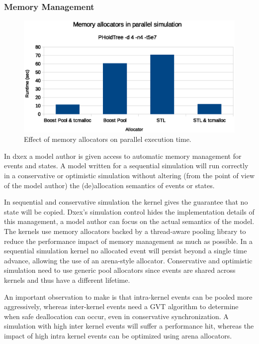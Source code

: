 \subsubsection{Memory Management}
\label{sec:4-subsec:overhead-pgraph:memory}
\begin{figure}
    \center
    \includegraphics[width=\modelfraction\columnwidth]{fig/memory_allocators_parallel.eps}
    \caption{Effect of memory allocators on parallel execution time.}
    \label{fig:memallocators_parallel}
\end{figure}


In dxex a model author is given access to automatic memory management for events and states.
A model written for a sequential simulation will run correctly in a conservative or optimistic simulation without altering (from the point of view of the model author) the (de)allocation semantics of events or states.

In sequential and conservative simulation the kernel gives the guarantee that no state will be copied.
Dxex's simulation control hides the implementation details of this management, a model author can focus on the actual semantics of the model.
The kernels use memory allocators backed by a thread-aware pooling library to reduce the performance impact of memory management as much as possible.
In a sequential simulation kernel no allocated event will persist beyond a single time advance, allowing the use of an arena-style allocator.
Conservative and optimistic simulation need to use generic pool allocators since events are shared across kernels and thus have a different lifetime.

An important observation to make is that intra-kernel events can be pooled more aggressively, whereas inter-kernel events need a GVT algorithm to determine when safe deallocation can occur, even in conservative synchronization.
A simulation with high inter kernel events will suffer a performance hit, whereas the impact of high intra kernel events can be optimized using arena allocators.


